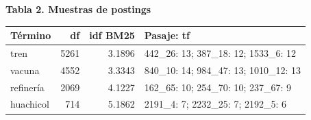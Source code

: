 \par\medskip\noindent\begin{minipage}{\linewidth}
\textbf{Tabla 2. Muestras de postings}\par\smallskip
\begin{tabularx}{\linewidth}{@{}lrrY@{}}\toprule
Término & df & idf BM25 & Pasaje: tf \\ \midrule
tren & 5261 & 3.1896 & 442\_\allowbreak{}26: 13; 387\_\allowbreak{}18: 12; 1533\_\allowbreak{}6: 12 \\
vacuna & 4552 & 3.3343 & 840\_\allowbreak{}10: 14; 984\_\allowbreak{}47: 13; 1010\_\allowbreak{}12: 13 \\
refinería & 2069 & 4.1227 & 162\_\allowbreak{}65: 10; 254\_\allowbreak{}70: 10; 237\_\allowbreak{}67: 9 \\
huachicol & 714 & 5.1862 & 2191\_\allowbreak{}4: 7; 2232\_\allowbreak{}25: 7; 2192\_\allowbreak{}5: 6 \\
\bottomrule\end{tabularx}\end{minipage}\par\medskip
